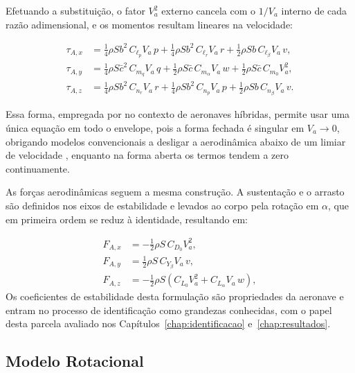 {Efetuando a substituição, o fator $V_a^2$ externo cancela com o $1/V_a$ interno de cada razão adimensional, e os momentos resultam lineares na velocidade:

\begin{align}
  \tau_{A,x} &= \tfrac{1}{4}\rho S b^2\, C_{\ell_p} V_a\, p + \tfrac{1}{4}\rho S b^2\, C_{\ell_r} V_a\, r + \tfrac{1}{2}\rho S b\, C_{\ell_\beta} V_a\, v,
  \label{eq:aero-reg-l} \\
  \tau_{A,y} &= \tfrac{1}{4}\rho S \bar{c}^2\, C_{m_q} V_a\, q + \tfrac{1}{2}\rho S \bar{c}\, C_{m_\alpha} V_a\, w + \tfrac{1}{2}\rho S \bar{c}\, C_{m_0} V_a^2,
  \label{eq:aero-reg-m} \\
  \tau_{A,z} &= \tfrac{1}{4}\rho S b^2\, C_{n_r} V_a\, r + \tfrac{1}{4}\rho S b^2\, C_{n_p} V_a\, p + \tfrac{1}{2}\rho S b\, C_{n_\beta} V_a\, v.
  \label{eq:aero-reg-n}
\end{align}

Essa forma, empregada por \textcite{Salahudden2023} no contexto de aeronaves híbridas, permite usar uma única equação em todo o envelope, pois a forma fechada é singular em $V_a \to 0$, obrigando modelos convencionais a desligar a aerodinâmica abaixo de um limiar de velocidade \cite{Graesdal2021, Hu2024}, enquanto na forma aberta os termos tendem a zero continuamente.

As forças aerodinâmicas seguem a mesma construção. A sustentação e o arrasto são definidos nos eixos de estabilidade e levados ao corpo pela rotação em $\alpha$, que em primeira ordem se reduz à identidade, resultando em:

\begin{align}
  F_{A,x} &= -\tfrac{1}{2}\rho S\, C_{D_0} V_a^2,
  \label{eq:aero-reg-fx} \\
  F_{A,y} &= \tfrac{1}{2}\rho S\, C_{Y_\beta} V_a\, v,
  \label{eq:aero-reg-fy} \\
  F_{A,z} &= -\tfrac{1}{2}\rho S \left( C_{L_0} V_a^2 + C_{L_\alpha} V_a\, w \right),
  \label{eq:aero-reg-fz}
\end{align}
Os coeficientes de estabilidade desta formulação são propriedades da aeronave e entram no processo de identificação como grandezas conhecidas, com o papel desta parcela avaliado nos Capítulos~\ref{chap:identificacao} e~\ref{chap:resultados}.
}

\subsection{Modelo Rotacional}

